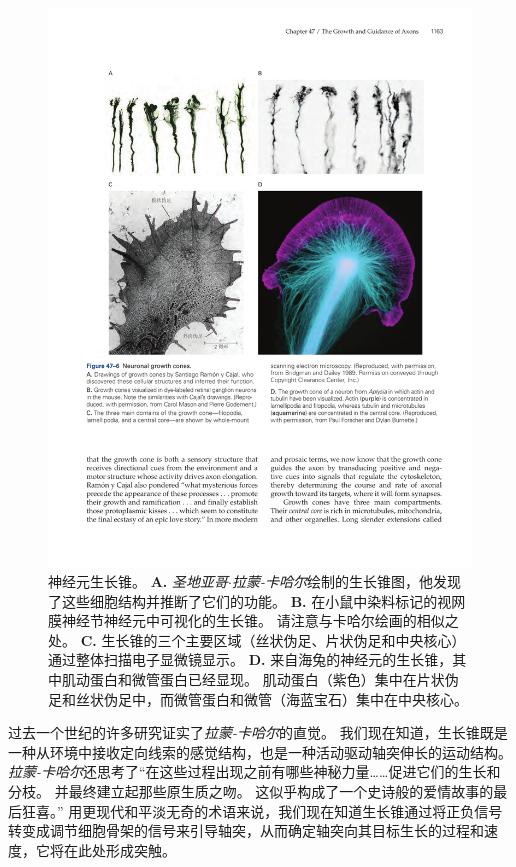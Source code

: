 \begin{figure}[htbp]
	\centering
	\includegraphics[width=0.95\linewidth]{chap47/fig_47_6}
	\caption{神经元生长锥。
		\textbf{A.} \textit{圣地亚哥$\cdot$拉蒙-卡哈尔}绘制的生长锥图，他发现了这些细胞结构并推断了它们的功能。
		\textbf{B.} 在小鼠中染料标记的视网膜神经节神经元中可视化的生长锥。
		请注意与卡哈尔绘画的相似之处。
		\textbf{C.} 生长锥的三个主要区域（丝状伪足、片状伪足和中央核心）通过整体扫描电子显微镜显示。
		\textbf{D.} 来自海兔的神经元的生长锥，其中肌动蛋白和微管蛋白已经显现。
		肌动蛋白（紫色）集中在片状伪足和丝状伪足中，而微管蛋白和微管（海蓝宝石）集中在中央核心。}
	\label{fig:47_6}
\end{figure}


过去一个世纪的许多研究证实了\textit{拉蒙-卡哈尔}的直觉。
我们现在知道，生长锥既是一种从环境中接收定向线索的感觉结构，也是一种活动驱动轴突伸长的运动结构。
\textit{拉蒙-卡哈尔}还思考了“在这些过程出现之前有哪些神秘力量……促进它们的生长和分枝。
并最终建立起那些原生质之吻。
这似乎构成了一个史诗般的爱情故事的最后狂喜。” 
用更现代和平淡无奇的术语来说，我们现在知道生长锥通过将正负信号转变成调节细胞骨架的信号来引导轴突，从而确定轴突向其目标生长的过程和速度，它将在此处形成突触。


